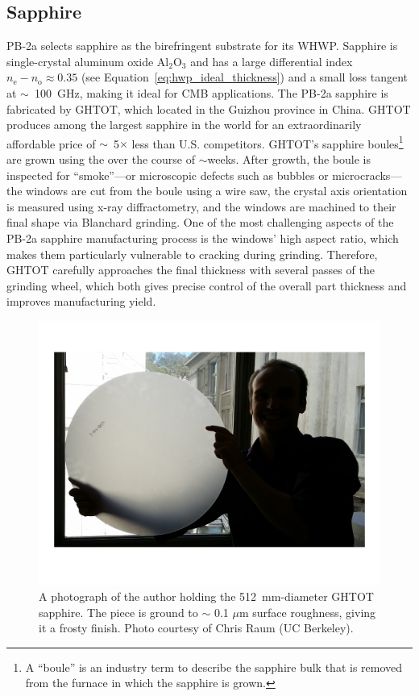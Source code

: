 
\subsection{Sapphire}
\label{sec:pb2a_whwp_sapphire}

PB-2a selects sapphire as the birefringent substrate for its WHWP. Sapphire is single-crystal aluminum oxide $\mathrm{Al_{2}O_{3}}$ and has a large differential index $n_{\mathrm{e}} - n_{\mathrm{o}} \approx 0.35$ (see Equation~\ref{eq:hwp_ideal_thickness}) and a small loss tangent at $\sim$~100~GHz, making it ideal for CMB applications. The PB-2a sapphire is fabricated by GHTOT, which located in the Guizhou province in China. GHTOT produces among the largest sapphire in the world for an extraordinarily affordable price of $\sim$~5$\times$ less than U.S. competitors. GHTOT's sapphire boules\footnote{A ``boule'' is an industry term to describe the sapphire bulk that is removed from the furnace in which the sapphire is grown.} are grown using the   over the course of $\sim$weeks. After growth, the boule is inspected for ``smoke''---or microscopic defects such as bubbles or microcracks---the windows are cut from the boule using a wire saw, the crystal axis orientation is measured using x-ray diffractometry, and the windows are machined to their final shape via Blanchard grinding. One of the most challenging aspects of the PB-2a sapphire manufacturing process is the windows' high aspect ratio, which makes them particularly vulnerable to cracking during grinding. Therefore, GHTOT carefully approaches the final thickness with several passes of the grinding wheel, which both gives precise control of the overall part thickness and improves manufacturing yield.

\begin{figure}[!t]
    \centering
    \includegraphics[width=0.7\linewidth, trim=0cm 3cm 3cm 3cm, clip]{PB2aWHWP/Figures/SapphirePicture.pdf}
    \caption[Photograph of GHTOT large diameter sapphire]{A photograph of the author holding the 512~mm-diameter GHTOT sapphire. The piece is ground to $\sim$ 0.1 $\mu$m surface roughness, giving it a frosty finish. Photo courtesy of Chris Raum (UC Berkeley).}
    \label{fig:sapphire_photo}
\end{figure}

